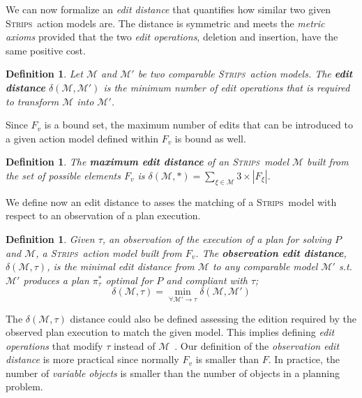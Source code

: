 \documentclass[letterpaper]{article} %
\newcommand{\strips}{\textsc{Strips}}     %
\newtheorem{definition}[theorem]{Definition}
\begin{document}
We can now formalize an {\em edit distance} that quantifies how similar two given \strips\ action models are. The distance is symmetric and meets the {\em metric axioms} provided that the two {\em edit operations}, deletion and insertion, have the same positive cost.

\begin{definition}
  Let $\mathcal{M}$ and $\mathcal{M}'$ be two {\em comparable} \strips\ action models. The {\bf edit distance} $\delta(\mathcal{M},\mathcal{M}')$ is the minimum number of {\em edit operations} that is required to transform $\mathcal{M}$ into $\mathcal{M}'$.
\end{definition}

Since $F_v$ is a bound set, the maximum number of edits that can be introduced to a given action model defined within $F_v$ is bound as well. 
\begin{definition}
The \textbf{maximum edit distance} of an \strips\ model $\mathcal{M}$ built from the set of possible elements $F_v$ is $\delta(\mathcal{M},*)=\sum_{\xi\in\mathcal{M}} 3\times|F_{\xi}|$.
\end{definition}

We define now an edit distance to asses the matching of a \strips\ model with respect to an observation of a plan execution. 

\begin{definition}
  Given $\tau$, an observation of the execution of a plan for solving $P$ and $\mathcal{M}$, a \strips\ action model built from $F_v$. The {\bf observation edit distance}, $\delta(\mathcal{M},\tau)$, is the minimal edit distance from $\mathcal{M}$ to any {\em comparable} model $\mathcal{M}'$ s.t. $\mathcal{M}'$ produces a plan $\pi^*_\tau$ optimal for $P$ and compliant with $\tau$; \[\delta(\mathcal{M},\tau)=\min_{\forall \mathcal{M}' \rightarrow \tau} \delta(\mathcal{M},\mathcal{M}')\]
\end{definition}

The $\delta(\mathcal{M},\tau)$ distance could also be defined assessing the edition required by the observed plan execution to match the given model. This implies defining {\em edit operations} that modify $\tau$ instead of $\mathcal{M}$~\cite{sohrabi:precognition:IJCAI2016}. Our definition of the {\em observation edit distance} is more practical since normally $F_v$ is smaller than $F$. In practice, the number of {\em variable objects} is smaller than the number of objects in a planning problem.
\end{document}
